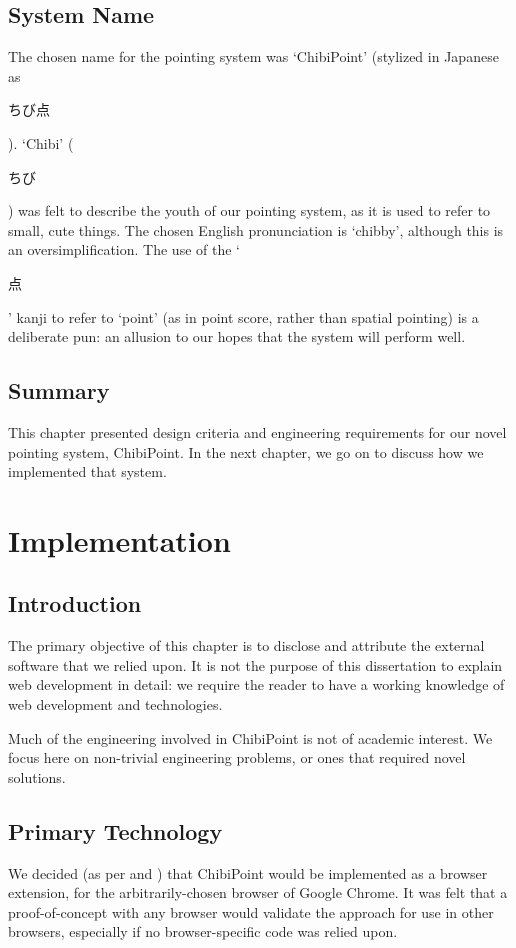 \documentclass[11pt,openright,a4paper]{report}
\begin{document}
\section{System Name}
The chosen name for the pointing system was `ChibiPoint' (stylized in Japanese as \begin{CJK}{UTF8}{min}ちび点\end{CJK}). `Chibi' (\begin{CJK}{UTF8}{min}ちび\end{CJK}) was felt to describe the youth of our pointing system, as it is used to refer to small, cute things. The chosen English pronunciation is `chibby', although this is an oversimplification. The use of the `\begin{CJK}{UTF8}{min}点\end{CJK}' kanji to refer to `point' (as in point score, rather than spatial pointing) is a deliberate pun: an allusion to our hopes that the system will perform well.

\section{Summary}
This chapter presented design criteria and engineering requirements for our novel pointing system, ChibiPoint. In the next chapter, we go on to discuss how we implemented that system.

\chapter{Implementation}
\label{chap:implementation}
\section{Introduction}
The primary objective of this chapter is to disclose and attribute the external software that we relied upon. It is not the purpose of this dissertation to explain web development in detail: we require the reader to have a working knowledge of web development and technologies.

Much of the engineering involved in ChibiPoint is not of academic interest. We focus here on non-trivial engineering problems, or ones that required novel solutions.

\section{Primary Technology}
We decided (as per  and ) that ChibiPoint would be implemented as a browser extension, for the arbitrarily-chosen browser of Google Chrome. It was felt that a proof-of-concept with any browser would validate the approach for use in other browsers, especially if no browser-specific code was relied upon.
\end{document}

